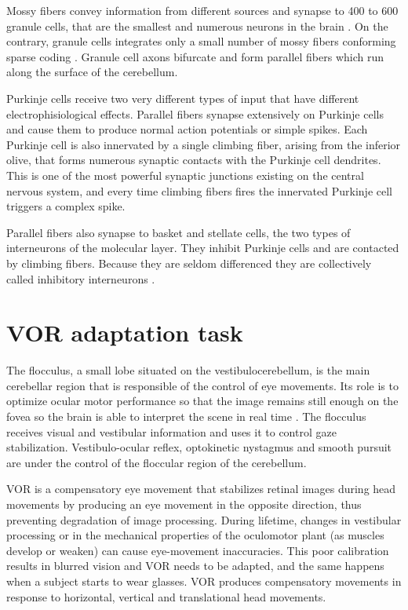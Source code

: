 \documentclass[doc,apacite,a4paper]{apa6}
\begin{document}
Mossy fibers convey information from different sources and synapse to 400 to 600 granule cells, that are the smallest and numerous neurons in the brain \cite{Marr1969}. On the contrary, granule cells integrates only a small number of mossy fibers conforming sparse coding \cite{Ito2006}. Granule cell axons bifurcate and form parallel fibers which run along the surface of the cerebellum.

Purkinje cells receive two very different types of input that have different electrophisiological effects. Parallel fibers synapse extensively on Purkinje cells and cause them to produce normal action potentials or simple spikes. Each Purkinje cell is also innervated by a single climbing fiber, arising from the inferior olive, that forms numerous synaptic contacts with the Purkinje cell dendrites. This is one of the most powerful synaptic junctions existing on the central nervous system, and every time climbing fibers fires the innervated Purkinje cell triggers a complex spike.

Parallel fibers also synapse to basket and stellate cells, the two types of interneurons of the molecular layer. They inhibit Purkinje cells and are contacted by climbing fibers. Because they are seldom differenced they are collectively called inhibitory interneurons \cite{Jorntell2010}.

\section{VOR adaptation task}

The flocculus, a small lobe situated on the vestibulocerebellum, is the main cerebellar region that is responsible of the control of eye movements. Its role is to optimize ocular motor performance so that the image remains still enough on the fovea so the brain is able to interpret the scene in real time \cite{Kheradmand2011}. The flocculus receives visual and vestibular information and uses it to control gaze stabilization. Vestibulo-ocular reflex, optokinetic nystagmus and smooth pursuit are under the control of the floccular region of the cerebellum.

VOR is a compensatory eye movement that stabilizes retinal images during head movements by producing an eye movement in the opposite direction, thus preventing degradation of image processing. During lifetime, changes in vestibular processing or in the mechanical properties of the oculomotor plant (as muscles develop or weaken) can cause eye-movement inaccuracies. This poor calibration results in blurred vision and VOR needs to be adapted, and the same happens when a subject starts to wear glasses. VOR produces compensatory movements in response to horizontal, vertical and translational head movements.
\end{document}
